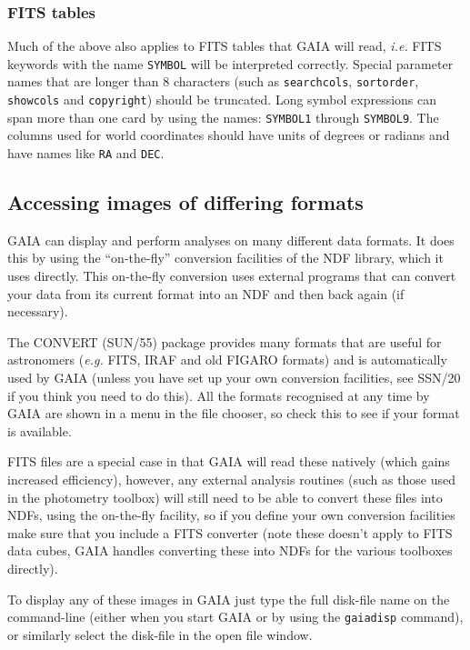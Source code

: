 \documentclass[twoside,11pt]{article}
\newcommand{\xref}[3]{#1}
\newcommand{\xlabel}[1]{}
\renewcommand{\_}{\texttt{\symbol{95}}}
\newcommand{\mytt}[1]{{\texttt{#1}}}
\begin{document}
\subsubsection{FITS tables} Much of the above also applies to FITS tables
that GAIA will read, \textit{i.e.} FITS keywords with the name
\mytt{SYMBOL} will be interpreted correctly. Special parameter names that are
longer than 8 characters (such as \mytt{search\_cols}, \mytt{sort\_order},
\mytt{show\_cols} and \mytt{copyright}) should be truncated. Long symbol
expressions can span more than one card by using the names: \mytt{SYMBOL1}
through \mytt{SYMBOL9}. The columns used for world coordinates should have
units of degrees or radians and have names like \mytt{RA} and \mytt{DEC}.

\subsection{\xlabel{image_formats}Accessing images of differing formats}

GAIA can display and perform analyses on many different data
formats. It does this by using the ``on-the-fly'' conversion
facilities of the NDF library, which it uses directly. This on-the-fly
conversion uses external programs that can convert your data from its
current format into an NDF and then back again (if necessary).

The CONVERT \xref{(SUN/55)}{sun55}{} package provides many formats
that are useful for astronomers (\textit{e.g.} FITS, IRAF and old FIGARO
formats) and is automatically used by GAIA (unless you have set up
your own conversion facilities, see \xref{SSN/20}{ssn20}{} if you
think you need to do this). All the formats recognised at any time by
GAIA are shown in a menu in the file chooser, so check this to see
if your format is available.

FITS files are a special case in that GAIA will read these natively
(which gains increased efficiency), however, any external analysis
routines (such as those used in the photometry toolbox) will still
need to be able to convert these files into NDFs, using the on-the-fly
facility, so if you define your own conversion facilities make sure
that you include a FITS converter (note these doesn't apply to FITS
data cubes, GAIA handles converting these into NDFs for the various 
toolboxes directly).

To display any of these images in GAIA just type the full disk-file
name on the command-line (either when you start GAIA or by using the
\mytt{gaiadisp} command), or similarly select the disk-file in the
open file window.
\end{document}
